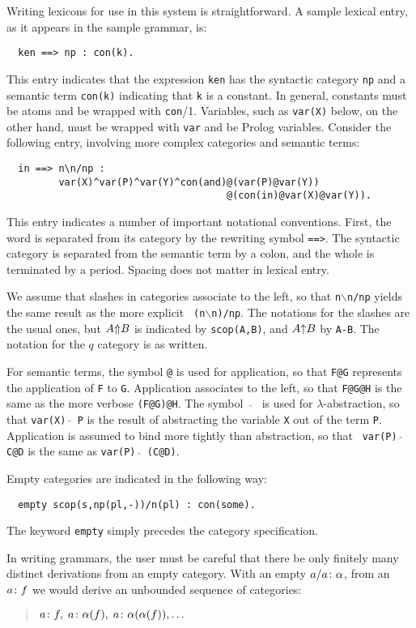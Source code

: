 Writing lexicons for use in this system is straightforward.  A sample
lexical entry, as it appears in the sample grammar, is:
%
\begin{verbatim}
  ken ==> np : con(k).
\end{verbatim}
%
This entry indicates that the expression {\tt ken} has the syntactic
category {\tt np} and a semantic term {\tt con(k)} indicating that
{\tt k} is a constant.  In general, constants must be atoms and be wrapped with
{\tt con}/1.  Variables, such as {\tt var(X)} below, on the other hand, 
must be wrapped with {\tt var} and be Prolog variables.  
Consider the following entry, involving more
complex categories and semantic terms:
%
\begin{verbatim}
  in ==> n\n/np : 
         var(X)^var(P)^var(Y)^con(and)@(var(P)@var(Y))
                                      @(con(in)@var(X)@var(Y)).
\end{verbatim}
%
This entry indicates a number of important notational conventions.
First, the word is separated from its category by the rewriting symbol
{\tt ==>}.  The syntactic category is separated from the semantic term
by a colon, and the whole is terminated by a period.  Spacing does not
matter in lexical entry.

We assume that slashes in categories associate to the left, so that
{\tt n$\backslash$n/np} yields the same result as the more explicit {\tt
(n$\backslash$n)/np}.  The notations for the slashes are the usual ones, but
$A{\Uparrow}B$ is indicated by {\tt scop(A,B)}, and $A {\uparrow} B$ by
{\tt A-B}.  The notation for the $q$ category is as written.

For semantic terms, the symbol {\tt @} is used for application, so
that {\tt F@G} represents the application of {\tt F} to {\tt G}.
Application associates to the left, so that {\tt F@G@H} is the same as
the more verbose {\tt (F@G)@H}.  The symbol \ $\hat{}$ \ is used for
$\lambda$-abstraction, so that {\tt var(X)\,$\hat{}$\,P} is the result of
abstracting the variable {\tt X} out of the term {\tt P}.  Application
is assumed to bind more tightly than abstraction, so that {\tt
var(P)\,$\hat{}$\,C@D} is the same as {\tt var(P)\,$\hat{}$\,(C@D)}.

Empty categories are indicated in the following way:
%
\begin{verbatim}
  empty scop(s,np(pl,-))/n(pl) : con(some).
\end{verbatim}
%
The keyword {\tt empty} simply precedes the category specification.

In writing grammars, the user must be careful that there be only
finitely many distinct derivations from an empty category.  With an
empty ${a / a\/\colon \alpha}$, from an $a\/\colon f$ we would
derive an unbounded sequence of categories:
\begin{quote}
$a\/\colon f, \; a\/\colon \alpha(f), \; a\/\colon \alpha(\alpha(f)), \ldots$
\end{quote}

